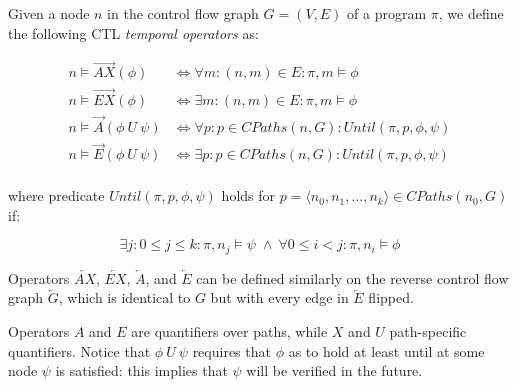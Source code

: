 \begin{definition}
Given a node $n$ in the control flow graph $G=(V,E)$ of a program $\pi$, we define the following CTL {\em temporal operators} as:

\begin{align*}
n \models \overrightarrow{AX}(\phi) &\Longleftrightarrow \forall m: (n,m)\in E: \pi,m\models\phi \\
n \models \overrightarrow{EX}(\phi) &\Longleftrightarrow \exists m: (n,m)\in E: \pi, m\models\phi \\
n \models \overrightarrow{A}(\phi~U~\psi) &\Longleftrightarrow \forall p: p\in CPaths(n,G): Until(\pi, p,\phi,\psi) \\
n \models \overrightarrow{E}(\phi~U~\psi) &\Longleftrightarrow \exists p: p\in CPaths(n,G): Until(\pi, p,\phi,\psi) \\
\end{align*}

\vspace{0.5em}
\noindent where predicate $Until(\pi,p,\phi,\psi)$ holds for $p = \langle n_0,n_1,\ldots,n_k\rangle \in CPaths(n_0,G)$ if:
\vspace{-0.5em}

\begin{equation*}
\exists j: 0 \le j\le k: \pi, n_j \models \psi \; \wedge \: \forall 0 \le i < j: \pi, n_i \models \phi
\end{equation*}

\noindent Operators $\overleftarrow{AX}$, $\overleftarrow{EX}$, $\overleftarrow{A}$, and $\overleftarrow{E}$ can be defined similarly on the reverse control flow graph $\overleftarrow{G}$, which is identical to $G$ but with every edge in $\overleftarrow{E}$ flipped.
\end{definition}

\noindent Operators $A$ and $E$ are quantifiers over paths, while $X$ and $U$ path-specific quantifiers. Notice that $\phi~U~\psi$ requires that $\phi$ as to hold at least until at some node $\psi$ is satisfied: this implies that $\psi$ will be verified in the future.

